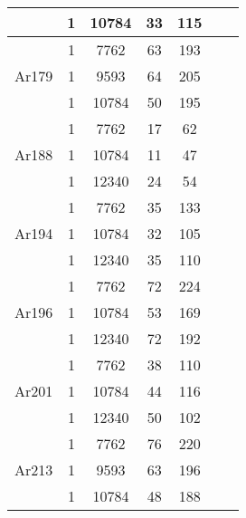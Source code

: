 \documentclass[../main.tex]{subfiles}
\begin{document}
\begin{table}[H]
\begin{center}
\begin{tabular}{ |c|c|c|c|c|c|c| }
		& 1 & 10784 & 33 & 115 \\ 
		\hline
		\multirow{3}{4em}{Ar179} & 1 & 7762 & 63 & 193 \\ 
		& 1 & 9593 & 64 & 205  \\ 
		& 1 & 10784 & 50 & 195 \\ 
		\hline
		\multirow{3}{4em}{Ar188} & 1 & 7762 & 17 & 62 \\ 
		& 1 & 10784 & 11 & 47  \\ 
		& 1 & 12340 & 24 & 54 \\ 
		\hline
		\multirow{3}{4em}{Ar194} & 1 & 7762 & 35 & 133 \\ 
		& 1 & 10784 & 32 & 105  \\ 
		& 1 & 12340 & 35 & 110 \\ 
		\hline
		\multirow{3}{4em}{Ar196} & 1 & 7762 & 72 & 224 \\ 
		& 1 & 10784 & 53 & 169  \\ 
		& 1 & 12340 & 72 & 192 \\ 
		\hline
		\multirow{3}{4em}{Ar201} & 1 & 7762 & 38 & 110 \\ 
		& 1 & 10784 & 44 & 116  \\ 
		& 1 & 12340 & 50 & 102 \\ 
		\hline
		\multirow{3}{4em}{Ar213} & 1 & 7762 & 76 & 220 \\ 
		& 1 & 9593 & 63 & 196  \\ 
		& 1 & 10784 & 48 & 188 \\ 
		\hline
	\end{tabular}
	\label{tab:indel}
\end{center}
\end{table}
\end{document}
